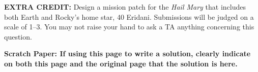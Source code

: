 \documentclass[11pt,addpoints]{exam}
\begin{document}
\begin{questions}
\newpage

\question \textbf{EXTRA CREDIT:}
Design a mission patch for the \textit{Hail Mary} that includes both Earth and Rocky's home star, 40 Eridani. Submissions will be judged on a scale of 1--3. You may not raise your hand to ask a TA anything concerning this question.

\newpage

\textbf{Scratch Paper: If using this page to write a solution, clearly indicate on both this page and the original page that the solution is here.}

%
%
%
%
%
%
%

\end{questions}
\end{document}
